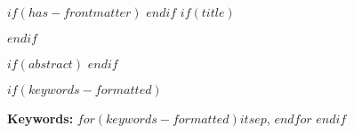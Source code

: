 $if(has-frontmatter)$
\frontmatter
$endif$
$if(title)$
\maketitle
$endif$

$if(abstract)$
$endif$

$if(keywords-formatted)$
\hfill

\noindent
\textbf{Keywords:} $for(keywords-formatted)$$it$$sep$, $endfor$
$endif$